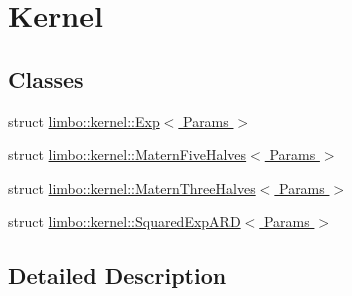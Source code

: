 \hypertarget{group__kernel}{}\section{Kernel}
\label{group__kernel}
\subsection*{Classes}
\begin{DoxyCompactItemize}
\item 
struct \hyperlink{structlimbo_1_1kernel_1_1_exp}{limbo\+::kernel\+::\+Exp$<$ Params $>$}
\item 
struct \hyperlink{structlimbo_1_1kernel_1_1_matern_five_halves}{limbo\+::kernel\+::\+Matern\+Five\+Halves$<$ Params $>$}
\item 
struct \hyperlink{structlimbo_1_1kernel_1_1_matern_three_halves}{limbo\+::kernel\+::\+Matern\+Three\+Halves$<$ Params $>$}
\item 
struct \hyperlink{structlimbo_1_1kernel_1_1_squared_exp_a_r_d}{limbo\+::kernel\+::\+Squared\+Exp\+A\+R\+D$<$ Params $>$}
\end{DoxyCompactItemize}


\subsection{Detailed Description}
